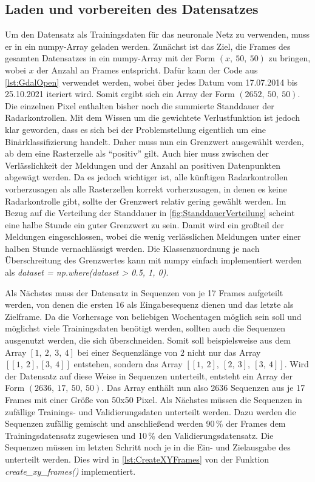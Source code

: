 \subsection{Laden und vorbereiten des Datensatzes}
\label{sec:DatensatzLaden}
Um den Datensatz als Trainingsdaten für das neuronale Netz zu verwenden, muss er in ein numpy-Array geladen werden.
Zunächst ist das Ziel, die Frames des gesamten Datensatzes in ein numpy-Array mit der Form $(x,~50,~50)$ zu bringen, wobei $x$ der Anzahl an Frames entspricht.
Dafür kann der Code aus \autoref{lst:GdalOpen} verwendet werden, wobei über jedes Datum vom 17.07.2014 bis 25.10.2021 iteriert wird.
Somit ergibt sich ein Array der Form $(2652,~50,~50)$.
Die einzelnen Pixel enthalten bisher noch die summierte Standdauer der Radarkontrollen.
Mit dem Wissen um die gewichtete Verlustfunktion ist jedoch klar geworden, dass es sich bei der Problemstellung eigentlich um eine Binärklassifizierung handelt.
Daher muss nun ein Grenzwert ausgewählt werden, ab dem eine Rasterzelle als "`positiv"' gilt.
Auch hier muss zwischen der Verlässlichkeit der Meldungen und der Anzahl an positiven Datenpunkten abgewägt werden.
Da es jedoch wichtiger ist, alle künftigen Radarkontrollen vorherzusagen als alle Rasterzellen korrekt vorherzusagen, in denen es keine Radarkontrolle gibt, sollte der Grenzwert relativ gering gewählt werden.
Im Bezug auf die Verteilung der Standdauer in \autoref{fig:StanddauerVerteilung} scheint eine halbe Stunde ein guter Grenzwert zu sein.
Damit wird ein großteil der Meldungen eingeschlossen, wobei die wenig verlässlichen Meldungen unter einer halben Stunde vernachlässigt werden.
Die Klassenzuordnung je nach Überschreitung des Grenzwertes kann mit numpy einfach implementiert werden als \emph{dataset = np.where(dataset > 0.5, 1, 0)}.

Als Nächstes muss der Datensatz in Sequenzen von je 17 Frames aufgeteilt werden, von denen die ersten 16 als Eingabesequenz dienen und das letzte als Zielframe.
Da die Vorhersage von beliebigen Wochentagen möglich sein soll und möglichst viele Trainingsdaten benötigt werden, sollten auch die Sequenzen ausgenutzt werden, die sich überschneiden.
Somit soll beispielsweise aus dem Array $[1,~2,~3,~4]$ bei einer Sequenzlänge von $2$ nicht nur das Array $[[1,~2], [3,~4]]$ entstehen, sondern das Array $[[1,~2],~[2,~3],~[3,~4]]$.
Wird der Datensatz auf diese Weise in Sequenzen unterteilt, entsteht ein Array der Form $(2636,~17,~50,~50)$.
Das Array enthält nun also 2636 Sequenzen aus je 17 Frames mit einer Größe von 50x50 Pixel.
Als Nächstes müssen die Sequenzen in zufällige Trainings- und Validierungsdaten unterteilt werden.
Dazu werden die Sequenzen zufällig gemischt und anschließend werden 90\,\% der Frames dem Trainingsdatensatz zugewiesen und 10\,\% den Validierungsdatensatz.
Die Sequenzen müssen im letzten Schritt noch je in die Ein- und Zielausgabe des  unterteilt werden.
Dies wird in \autoref{lst:CreateXYFrames} von der Funktion \emph{create\_xy\_frames()} implementiert.

